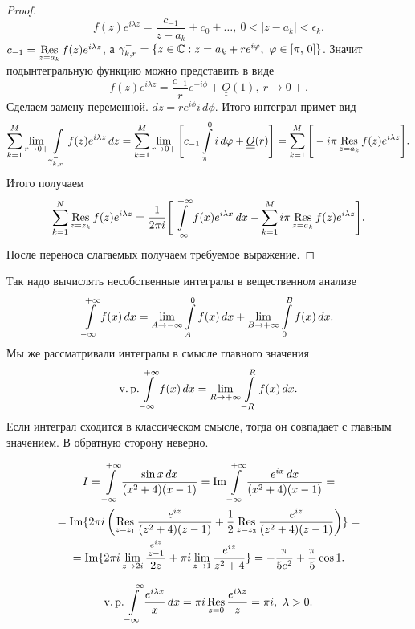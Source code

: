 \begin{proof}
		\[ f(z)e^{i\lambda z} = \frac{c_{-1}}{z-a_k} + c_0 + \ldots,\ 0<|z-a_k|<\epsilon_k. \]
		$c_{-1} = \mathop{\operatorname{Res}}\limits_{z=a_k}f(z)e^{i\lambda z}$, а $\gamma_{k,r}^- = \{z\in\mathbb{C}: z = a_k+re^{i\varphi},\ \varphi\in[\pi,\,0]\}$.
		Значит подынтегральную функцию можно представить в виде
		\[ f(z)e^{i\lambda z} = \frac{c_{-1}}{r}e^{-i\phi}+\underline{\underline O}(1),\ r\to0+. \]
		Сделаем замену переменной. $dz = re^{i\phi}i\,d\phi$. Итого интеграл примет вид 
		\[ \sum\limits_{k=1}^{M}\lim\limits_{r\to0+}\int\limits_{\gamma^-_{k,r}}f(z)e^{i\lambda z}\,dz = \sum\limits_{k=1}^M\lim\limits_{r\to0+}\Bigg[ c_{-1}\int\limits_\pi^0i\,d\varphi + \underline{\underline O}(r)\Bigg] = \sum\limits_{k=1}^M\Bigg[ -i\pi\mathop{\operatorname{Res}}\limits_{z=a_k}f(z)e^{i\lambda z}\Bigg]. \]
		Итого получаем 
		\[ \sum\limits_{k=1}^N\mathop{\operatorname{Res}}\limits_{z=z_k}f(z)e^{i\lambda z}=\frac{1}{2\pi i}\Bigg[ \int\limits_{-\infty}^{+\infty}f(x)e^{i\lambda x}\,dx - \sum\limits_{k=1}^M i\pi\mathop{\operatorname{Res}}\limits_{z=a_k}f(z)e^{i\lambda z} \Bigg]. \]
		После переноса слагаемых получаем требуемое выражение.
	\end{proof}
	\begin{remark}
		Так надо вычислять несобственные интегралы в вещественном анализе
		\[ \int\limits_{-\infty}^{+\infty}f(x)\,dx = \lim_{A\to-\infty}\int\limits_A^0f(x)\,dx + \lim_{B\to+\infty}\int\limits_0^Bf(x)\,dx. \]
		Мы же рассматривали интегралы в смысле главного значения
		\[ \operatorname{v.p.}\int\limits_{-\infty}^{+\infty}f(x)\,dx = \lim\limits_{R\to+\infty}\int\limits_{-R}^R f(x)\,dx. \]
		Если интеграл сходится в классическом смысле, тогда он совпадает с главным значением. В обратную сторону неверно.
	\end{remark}
	\begin{example*}
		\begin{multline*}
			I = \int\limits_{-\infty}^{+\infty}\frac{\sin x\,dx}{(x^2+4)(x-1)} = \operatorname{Im}\int\limits_{-\infty}^{+\infty}\frac{e^{ix}\,dx}{(x^2+4)(x-1)} =\\= \operatorname{Im}\{2\pi i\left(  \mathop{\operatorname{Res}}\limits_{z=z_1}\frac{e^{iz}}{(z^2+4)(z-1)} + \frac{1}{2}\mathop{\operatorname{Res}}\limits_{z=z_3}\frac{e^{iz}}{(z^2+4)(z-1)}\right) \} =\\= \operatorname{Im}\{2\pi i\lim\limits_{z\to2i}\frac{\frac{e^{iz}}{z-1}}{2z} + \pi i\lim\limits_{z\to 1}\frac{e^{iz}}{z^2+4} \} = -\frac{\pi}{5e^2} + \frac{\pi}{5}\cos1.
		\end{multline*}
	\end{example*}
	\begin{example*}
		\[ \operatorname{v.p.}\Int_{-\infty}^{+\infty}\frac{e^{i\lambda x}}{x}\,dx = \pi i\Res_{z=0}\frac{e^{i\lambda z}}{z} = \pi i,\ \lambda>0. \]
	\end{example*}
